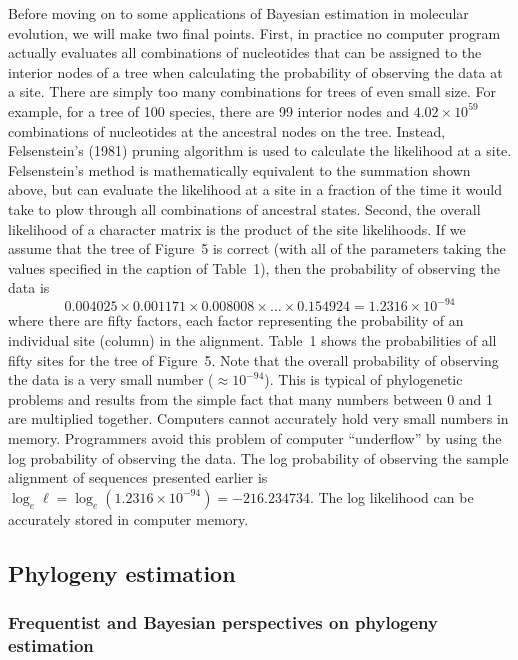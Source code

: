 \documentclass{svmult}
\begin{document}
Before moving on to some applications of Bayesian estimation in molecular evolution, we will make two final points. First,
in practice no computer program actually evaluates all combinations of nucleotides that can be assigned to
the interior nodes of a tree when calculating the probability of observing the data at a site. There are simply too many combinations
for trees of even small size. For example, for a tree of 100 species, there are 99 interior nodes and $4.02 \times 10^{59}$ combinations
of nucleotides at the ancestral nodes on the tree. 
Instead, Felsenstein's (1981)
pruning algorithm is used to calculate the likelihood at a site. Felsenstein's method is mathematically equivalent to the
summation shown above, but can evaluate the likelihood at a site in a fraction of the time it would take to plow through all combinations of ancestral states. Second, the overall likelihood of
a character matrix is the product of the site likelihoods. If we assume that the tree of Figure~5 is correct
(with all of the parameters taking the values specified in the caption of Table~1), then the probability of observing the data
is
$$
0.004025 \times 0.001171 \times 0.008008 \times \ldots \times  0.154924 = 1.2316 \times 10^{-94}
$$
where there are fifty factors, each factor representing the probability of an individual site (column) in the alignment. Table~1 shows
the probabilities of all fifty sites for the tree of Figure~5. Note that the overall probability of observing the data is a very small
number ($\approx 10^{-94}$). This is typical of phylogenetic problems and results from the simple fact that many numbers between
0 and 1 are multiplied together. Computers cannot accurately hold very small numbers in memory. Programmers avoid this problem
of computer ``underflow'' by using the log probability of observing the data. The log probability of observing the sample alignment of
sequences presented earlier is  $\log_e \ell = \log_e(1.2316 \times 10^{-94}) = -216.234734$. The log likelihood can be accurately
stored in computer memory.

\subsection{Phylogeny estimation}

\subsubsection{Frequentist and Bayesian perspectives on phylogeny estimation}
\end{document}
